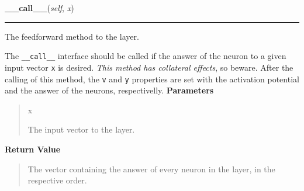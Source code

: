     \label{peach:nn:base:Layer:__call__}

    \vspace{0.5ex}

\hspace{.8\funcindent}\begin{boxedminipage}{\funcwidth}

    \raggedright \textbf{\_\_call\_\_}(\textit{self}, \textit{x})

    \vspace{-1.5ex}

    \rule{\textwidth}{0.5\fboxrule}
\setlength{\parskip}{2ex}

The feedforward method to the layer.

The \texttt{\_\_call\_\_} interface should be called if the answer of the neuron
to a given input vector \texttt{x} is desired. \emph{This method has collateral
effects}, so beware. After the calling of this method, the \texttt{v} and
\texttt{y} properties are set with the activation potential and the answer of
the neurons, respectivelly.
\setlength{\parskip}{1ex}
      \textbf{Parameters}
      \vspace{-1ex}

      \begin{quote}
        \begin{Ventry}{x}

          \item[x]


The input vector to the layer.
        \end{Ventry}

      \end{quote}

      \textbf{Return Value}
    \vspace{-1ex}

      \begin{quote}

The vector containing the answer of every neuron in the layer, in the
respective order.
      \end{quote}

    \end{boxedminipage}

    \label{peach:nn:base:Layer:__getitem__}

